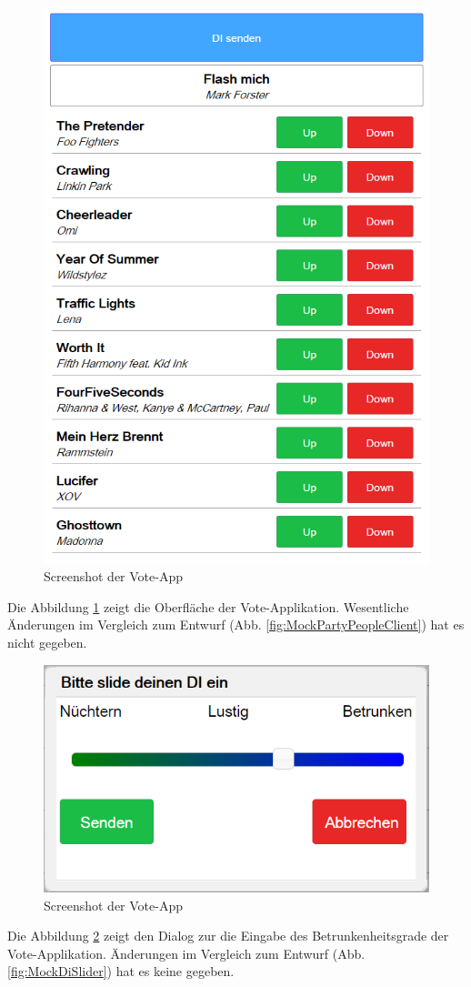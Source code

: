 \begin{figure}[H]
\centering
\includegraphics[width=0.6\linewidth]{Bilder/Screenshot-Vote-App}
\caption{Screenshot der Vote-App}
\label{fig:Screenshot-Vote-App}
\end{figure}

Die Abbildung \ref{fig:Screenshot-Vote-App} zeigt die Oberfläche der Vote-Applikation. Wesentliche Änderungen im Vergleich zum Entwurf (Abb. \ref{fig:MockPartyPeopleClient}) hat es nicht gegeben. 

\begin{figure}[H]
\centering
\includegraphics[width=0.5\linewidth]{Bilder/Screenshot-VoteApp-DI-Slider}
\caption{Screenshot der Vote-App}
\label{fig:Screenshot-Vote-App_Slider}
\end{figure}

Die Abbildung \ref{fig:Screenshot-Vote-App_Slider} zeigt den Dialog zur die Eingabe des Betrunkenheitsgrade der Vote-Applikation. Änderungen im Vergleich zum Entwurf (Abb. \ref{fig:MockDiSlider}) hat es keine gegeben.